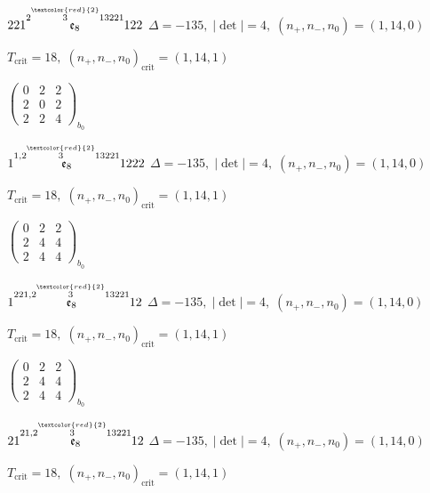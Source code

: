 \documentclass[10pt]{article}
\begin{document}
$221\overset{2\overset{\textcolor{red}{2}}{3}13221}{\mathfrak{e}_8}122$ \quad $\Delta=-135,\; |\det|=4,\; (n_+,n_-,n_0)=(1,14,0)$

\hspace{1em}$T_{\text{crit}}=18,\; (n_+,n_-,n_0)_{\text{crit}}=(1,14,1)$

\hspace{2em}$\left(\begin{smallmatrix}0 & 2 & 2 \\ 2 & 0 & 2 \\ 2 & 2 & 4\end{smallmatrix}\right)_{\!b_0}$

\smallskip

$1\overset{1,2\overset{\textcolor{red}{2}}{3}13221}{\mathfrak{e}_8}1222$ \quad $\Delta=-135,\; |\det|=4,\; (n_+,n_-,n_0)=(1,14,0)$

\hspace{1em}$T_{\text{crit}}=18,\; (n_+,n_-,n_0)_{\text{crit}}=(1,14,1)$

\hspace{2em}$\left(\begin{smallmatrix}0 & 2 & 2 \\ 2 & 4 & 4 \\ 2 & 4 & 4\end{smallmatrix}\right)_{\!b_0}$

\smallskip

$1\overset{221,2\overset{\textcolor{red}{2}}{3}13221}{\mathfrak{e}_8}12$ \quad $\Delta=-135,\; |\det|=4,\; (n_+,n_-,n_0)=(1,14,0)$

\hspace{1em}$T_{\text{crit}}=18,\; (n_+,n_-,n_0)_{\text{crit}}=(1,14,1)$

\hspace{2em}$\left(\begin{smallmatrix}0 & 2 & 2 \\ 2 & 4 & 4 \\ 2 & 4 & 4\end{smallmatrix}\right)_{\!b_0}$

\smallskip

$21\overset{21,2\overset{\textcolor{red}{2}}{3}13221}{\mathfrak{e}_8}12$ \quad $\Delta=-135,\; |\det|=4,\; (n_+,n_-,n_0)=(1,14,0)$

\hspace{1em}$T_{\text{crit}}=18,\; (n_+,n_-,n_0)_{\text{crit}}=(1,14,1)$
\end{document}
